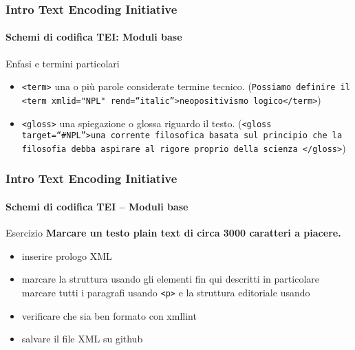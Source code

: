 \begin{frame}
	\frametitle{Intro Text Encoding Initiative}
	\framesubtitle{Schemi di codifica TEI: Moduli base}
	\addtocounter{nframe}{1}

    \begin{block}{Enfasi e termini particolari}
        \begin{itemize}
            \item \texttt{<term>} una o più parole considerate termine tecnico.
            (\texttt{Possiamo definire il <term xml\:id="NPL" rend=``italic''>neopositivismo logico</term>})
            \item \texttt{<gloss>} una spiegazione o glossa riguardo il testo.
            (\texttt{<gloss target=``\#NPL''>una corrente filosofica basata
            sul principio che la filosofia debba aspirare al rigore
            proprio della scienza </gloss>})
        \end{itemize}
    \end{block}
    
\end{frame}

\begin{frame}
	\frametitle{Intro Text Encoding Initiative}
	\framesubtitle{Schemi di codifica TEI – Moduli base}
	\addtocounter{nframe}{1}

	\begin{block}{Esercizio}
       \textbf{ Marcare un testo plain text di circa 3000 caratteri a piacere.}
        \begin{itemize}
            \item inserire prologo XML
            \item marcare la struttura usando gli elementi fin qui descritti
            in particolare marcare tutti i paragrafi usando \texttt{<p>} e la struttura editoriale usando 
            \item verificare che sia ben formato con xmllint
            \item salvare il file XML su github
        \end{itemize}
    \end{block}
\end{frame}





